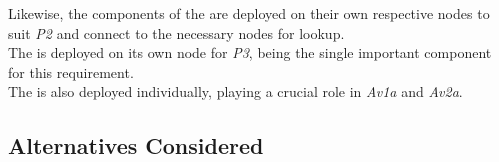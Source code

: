 Likewise, the components of the  are deployed on their own respective nodes to suit \emph{P2} and connect to the necessary nodes for lookup.\\
The  is deployed on its own node for \emph{P3}, being the single important component for this requirement.\\
The  is also deployed individually, playing a crucial role in \emph{Av1a} and \emph{Av2a}.

\subsection*{Alternatives Considered}

